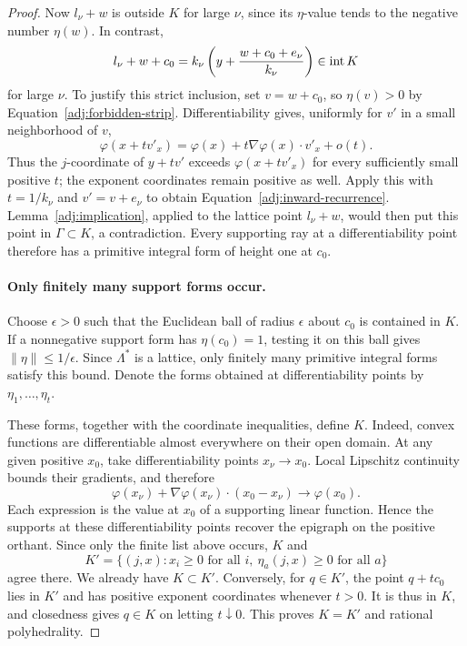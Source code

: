 \begin{proof}
Now $l_\nu+w$ is outside $K$ for large $\nu$, since its
$\eta$-value tends to the negative number $\eta(w)$.  In contrast,
\begin{equation}\label{adj:inward-recurrence}
 l_\nu+w+c_0
   =k_\nu\left(y+\frac{w+c_0+e_\nu}{k_\nu}\right)
      \in\operatorname{int} K
\end{equation}
for large $\nu$.  To justify this strict inclusion, set
$v=w+c_0$, so $\eta(v)>0$ by
Equation~\eqref{adj:forbidden-strip}.  Differentiability gives,
uniformly for $v'$ in a small neighborhood of $v$,
\[
 \varphi(x+t v'_x)
  =\varphi(x)+t\nabla\varphi(x)\cdot v'_x+o(t).
\]
Thus the $j$-coordinate of $y+t v'$ exceeds
$\varphi(x+t v'_x)$ for every sufficiently small positive $t$;
the exponent coordinates remain positive as well.  Apply this with
$t=1/k_\nu$ and $v'=v+e_\nu$ to obtain
Equation~\eqref{adj:inward-recurrence}.
Lemma~\ref{adj:implication}, applied to the lattice point
$l_\nu+w$, would then put this point in $\Gamma\subset K$, a
contradiction.  Every supporting ray at a differentiability point
therefore has a primitive integral form of height one at $c_0$.

\paragraph{Only finitely many support forms occur.}
Choose $\epsilon>0$ such that the Euclidean ball of radius
$\epsilon$ about $c_0$ is contained in $K$.  If a nonnegative
support form has $\eta(c_0)=1$, testing it on this ball gives
$\|\eta\|\le1/\epsilon$.  Since $\Lambda^*$ is a lattice, only
finitely many primitive integral forms satisfy this bound.  Denote
the forms obtained at differentiability points by
$\eta_1,\ldots,\eta_t$.

These forms, together with the coordinate inequalities, define
$K$.  Indeed, convex functions are differentiable almost everywhere
on their open domain.  At any given positive $x_0$, take
differentiability points $x_\nu\to x_0$.  Local Lipschitz continuity
bounds their gradients, and therefore
\[
 \varphi(x_\nu)+\nabla\varphi(x_\nu)\cdot(x_0-x_\nu)
       \longrightarrow\varphi(x_0).
\]
Each expression is the value at $x_0$ of a supporting linear
function.  Hence the supports at these differentiability points
recover the epigraph on the positive orthant.  Since only the finite
list above occurs, $K$ and
\[
 K'=\{(j,x):x_i\ge0\text{ for all }i,
                     \ \eta_a(j,x)\ge0\text{ for all }a\}
\]
agree there.  We already have $K\subset K'$.  Conversely, for
$q\in K'$, the point $q+t c_0$ lies in $K'$ and has positive
exponent coordinates whenever $t>0$.  It is thus in $K$, and
closedness gives $q\in K$ on letting $t\downarrow0$.  This proves
$K=K'$ and rational polyhedrality.


\end{proof}
